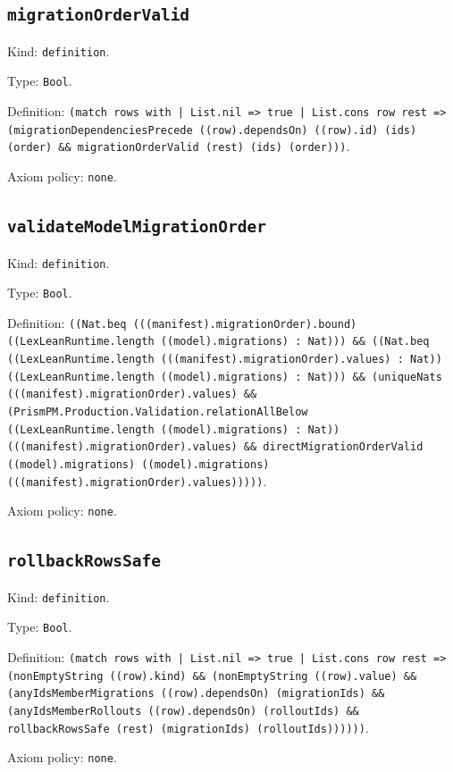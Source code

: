 \documentclass[11pt]{article}
\begin{document}
\subsection*{\texttt{migrationOrderValid}}
\noindent Kind: \texttt{definition}.\par
\noindent Type: \texttt{Bool}.\par
\noindent Definition: \texttt{(match rows with | List.nil => true | List.cons row rest => (migrationDependenciesPrecede ((row).dependsOn) ((row).id) (ids) (order) \&\& migrationOrderValid (rest) (ids) (order)))}.\par
\noindent Axiom policy: \texttt{none}.\par
\subsection*{\texttt{validateModelMigrationOrder}}
\noindent Kind: \texttt{definition}.\par
\noindent Type: \texttt{Bool}.\par
\noindent Definition: \texttt{((Nat.beq (((manifest).migrationOrder).bound) ((LexLeanRuntime.length ((model).migrations) : Nat))) \&\& ((Nat.beq ((LexLeanRuntime.length (((manifest).migrationOrder).values) : Nat)) ((LexLeanRuntime.length ((model).migrations) : Nat))) \&\& (uniqueNats (((manifest).migrationOrder).values) \&\& (PrismPM.Production.Validation.relationAllBelow ((LexLeanRuntime.length ((model).migrations) : Nat)) (((manifest).migrationOrder).values) \&\& directMigrationOrderValid ((model).migrations) ((model).migrations) (((manifest).migrationOrder).values)))))}.\par
\noindent Axiom policy: \texttt{none}.\par
\subsection*{\texttt{rollbackRowsSafe}}
\noindent Kind: \texttt{definition}.\par
\noindent Type: \texttt{Bool}.\par
\noindent Definition: \texttt{(match rows with | List.nil => true | List.cons row rest => (nonEmptyString ((row).kind) \&\& (nonEmptyString ((row).value) \&\& (anyIdsMemberMigrations ((row).dependsOn) (migrationIds) \&\& (anyIdsMemberRollouts ((row).dependsOn) (rolloutIds) \&\& rollbackRowsSafe (rest) (migrationIds) (rolloutIds))))))}.\par
\noindent Axiom policy: \texttt{none}.\par
\end{document}
